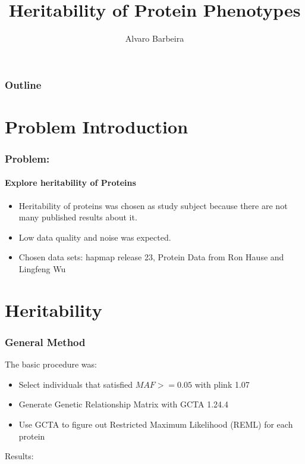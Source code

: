 \documentclass{beamer}
\title{Heritability of Protein Phenotypes}
\author{Alvaro Barbeira}
\begin{document}
  \begin{frame}
    \titlepage
  \end{frame}
  \begin{frame}
    \frametitle{Outline}
    \tableofcontents
  \end{frame}
  \section{Problem Introduction}
  \begin{frame}
    \frametitle{Problem:}
    \framesubtitle{Explore heritability of Proteins}
    \begin{itemize}
      \item
      Heritability of proteins was chosen as study subject because there are not many published results about it.
      \item
      Low data quality and noise was expected.
      \item
      Chosen data sets: hapmap release 23, Protein Data from Ron Hause and Lingfeng Wu
    \end{itemize}
  \end{frame}
  
  \section{Heritability}
  \begin{frame}
    \frametitle{General Method}
    The basic procedure was:
    \begin{itemize}
      \item
      Select individuals that satisfied $MAF >= 0.05$ with plink 1.07
      \item
      Generate Genetic Relationship Matrix with GCTA 1.24.4
      \item
      Use GCTA to figure out Restricted Maximum Likelihood (REML) for each protein
    \end{itemize}
    
    Results:
  \end{frame}
\end{document}
